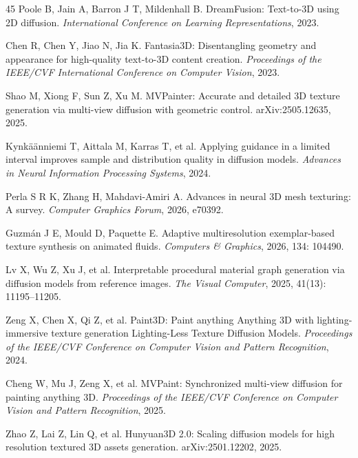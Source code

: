 \documentclass[times,twocolumn,final]{elsarticle}
\providecommand{\DIFadd}[1]{{\protect\color{blue} \sf #1}} %
\providecommand{\DIFdel}[1]{{\protect\color{red} \scriptsize #1}} %
\providecommand{\DIFaddbegin}{} %
\providecommand{\DIFaddend}{} %
\providecommand{\DIFdelbegin}{} %
\providecommand{\DIFdelend}{} %
\begin{document}
\begin{thebibliography}{45}
Poole B, Jain A, Barron J T, Mildenhall B. DreamFusion: Text-to-3D using 2D diffusion. \textit{International Conference on Learning Representations}, 2023.

Chen R, Chen Y, Jiao N, Jia K. Fantasia3D: Disentangling geometry and appearance for high-quality text-to-3D content creation. \textit{Proceedings of the IEEE/CVF International Conference on Computer Vision}, 2023.

Shao M, Xiong F, Sun Z, Xu M. MVPainter: Accurate and detailed 3D texture generation via multi-view diffusion with geometric control. arXiv:2505.12635, 2025.

Kynk\"a\"anniemi T, Aittala M, Karras T, et al. Applying guidance in a limited interval improves sample and distribution quality in diffusion models. \textit{Advances in Neural Information Processing Systems}, 2024.

Perla S R K, Zhang H, Mahdavi-Amiri A. Advances in neural 3D mesh texturing: A survey. \textit{Computer Graphics Forum}, 2026, e70392.

Guzm\'an J E, Mould D, Paquette E. Adaptive multiresolution exemplar-based texture synthesis on animated fluids. \textit{Computers \& Graphics}, 2026, 134: 104490.

Lv X, Wu Z, Xu J, et al. Interpretable procedural material graph generation via diffusion models from reference images. \textit{The Visual Computer}, 2025, 41(13): 11195--11205.

Zeng X, Chen X, Qi Z, et al. Paint3D: Paint \DIFdelbegin \DIFdel{anything }\DIFdelend \DIFaddbegin \DIFadd{Anything }\DIFaddend 3D with \DIFdelbegin \DIFdel{lighting-immersive texture generation}\DIFdelend \DIFaddbegin \DIFadd{Lighting-Less Texture Diffusion Models}\DIFaddend . \textit{Proceedings of the IEEE/CVF Conference on Computer Vision and Pattern Recognition}, 2024.

Cheng W, Mu J, Zeng X, et al. MVPaint: Synchronized multi-view diffusion for painting anything 3D. \textit{Proceedings of the IEEE/CVF Conference on Computer Vision and Pattern Recognition}, 2025.

Zhao Z, Lai Z, Lin Q, et al. Hunyuan3D 2.0: Scaling diffusion models for high resolution textured 3D assets generation. arXiv:2501.12202, 2025.


\end{thebibliography}
\end{document}
